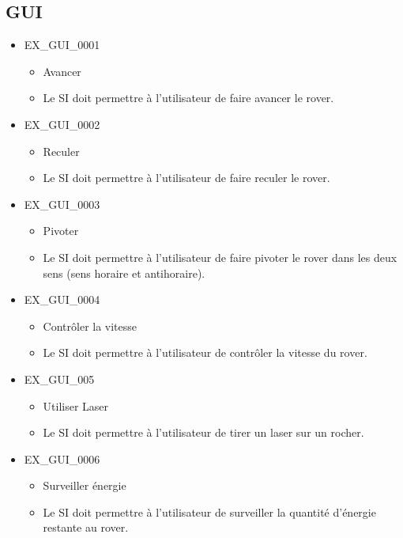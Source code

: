\documentclass[12pt,a4paper]{scrartcl}
\begin{document}
\subsection{GUI}

\begin{itemize}

\item EX\_GUI\_0001
\begin{itemize}
\item Avancer
\item Le SI doit permettre à l'utilisateur de faire avancer le rover.
\end{itemize}

\item EX\_GUI\_0002
\begin{itemize}
\item Reculer
\item Le SI doit permettre à l'utilisateur de faire reculer le rover.
\end{itemize}

\item EX\_GUI\_0003
\begin{itemize}
\item Pivoter
\item Le SI doit permettre à l'utilisateur de faire pivoter le rover dans les 			deux sens (sens horaire et antihoraire).
\end{itemize}

\item EX\_GUI\_0004
\begin{itemize}
\item Contrôler la vitesse
\item Le SI doit permettre à l'utilisateur de contrôler la vitesse du rover.
\end{itemize}

\item EX\_GUI\_005
\begin{itemize}
\item Utiliser Laser
\item Le SI doit permettre à l'utilisateur de tirer un laser sur un rocher.
\end{itemize}


\item EX\_GUI\_0006
\begin{itemize}
\item Surveiller énergie
\item Le SI doit permettre à l'utilisateur de surveiller la quantité d'énergie
		restante au rover.
\end{itemize}


\end{itemize}
\end{document}
